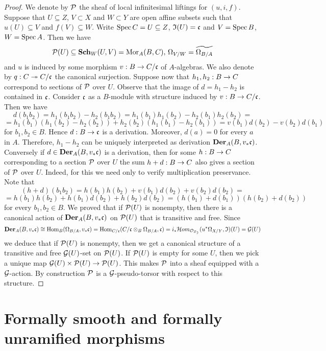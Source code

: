 \begin{proof}
We denote by ${\mathcal P}$ the sheaf of local infinitesimal liftings for $(u,i,f)$. Suppose that $U\subseteq Z$, $V\subset X$ and $W\subset Y$  are open affine subsets such that $u(U)\subseteq V$ and $f(V)\subseteq W$. Write $\mathrm{Spec}\, C = U\subseteq Z$, $\mathfrak{I}(U)=\mathfrak{c}$ and $V = \mathrm{Spec}\, B$, $W = \mathrm{Spec}\, A$. Then we have
$${\mathcal P}(U)\subseteq \mathbf{Sch}_W(U,V) = \mathrm{Mor}_A(B,C),\,\Omega_{V/W}=\widetilde{\Omega_{B/A}}$$
and $u$ is induced by some morphism $v:B\rightarrow C/\mathfrak{c}$ of $A$-algebras. We also denote by $q:C\twoheadrightarrow C/\mathfrak{c}$ the canonical surjection. Suppose now that $h_1,h_2:B\rightarrow C$ correspond to sections of ${\mathcal P}$ over $U$. Observe that the image of $d=h_1-h_2$ is contained in $\mathfrak{c}$. Consider $\mathfrak{c}$ as a $B$-module with structure induced by $v:B\rightarrow C/\mathfrak{c}$. Then we have
$$d(b_1b_2) = h_1(b_1b_2)-h_2(b_1b_2) = h_1(b_1)h_1(b_2)-h_2(b_1)h_2(b_2) =$$
$$= h_1(b_1)(h_1(b_2)-h_2(b_2))+h_2(b_2)(h_1(b_1)-h_2(b_1))=v(b_1)d(b_2)-v(b_2)d(b_1)$$
for $b_1,b_2\in B$. Hence $d:B\rightarrow \mathfrak{c}$ is a derivation. Moreover, $d(a)=0$ for every $a$ in $A$. Therefore, $h_1-h_2$ can be uniquely interpreted as derivation $\mathbf{Der}_A(B,v_*\mathfrak{c})$. Conversely if $d\in \mathbf{Der}_A(B,v_*\mathfrak{c})$ is a derivation, then for some $h:B\rightarrow C$ corresponding to a section ${\mathcal P}$ over $U$ the sum $h+d:B\rightarrow C$ also gives a section of ${\mathcal P}$ over $U$. Indeed, for this we need only to verify multiplication preservance. Note that
$$(h+d)(b_1b_2)=h(b_1)h(b_2)+v(b_1)d(b_2)+v(b_2)d(b_2)=$$
$$= h(b_1)h(b_2)+h(b_1)d(b_2)+h(b_2)d(b_2)=(h(b_1)+d(b_1))(h(b_2)+d(b_2))$$
for every $b_1,b_2\in B$. We proved that if ${\mathcal P}(U)$ is nonempty, then there is a canonical action of $\mathbf{Der}_A(B,v_*\mathfrak{c})$ on ${\mathcal P}(U)$ that is transitive and free. Since $$\mathbf{Der}_A(B,v_*\mathfrak{c})\cong \mathrm{Hom}_B(\Omega_{B/A},v_*\mathfrak{c})=\mathrm{Hom}_{C/\mathfrak{c}}(C/\mathfrak{c}\otimes_B\Omega_{B/A},\mathfrak{c})= i_*{\mathcal H}om_{{\mathcal O}_{Z_{\mathfrak{I}}}}(u^*\Omega_{X/Y},\mathfrak{I})(U)={\mathcal G}(U)$$
we deduce that if ${\mathcal P}(U)$ is nonempty, then we get a canonical structure of a transitive and free ${\mathcal G}(U)$-set on ${\mathcal P}(U)$. If ${\mathcal P}(U)$ is empty for some $U$, then we pick a unique map ${\mathcal G}(U)\times {\mathcal P}(U)\rightarrow {\mathcal P}(U)$. This makes ${\mathcal P}$ into a sheaf equipped with a ${\mathcal G}$-action. By construction ${\mathcal P}$ is a ${\mathcal G}$-pseudo-torsor with respect to this structure.
\end{proof}

\section{Formally smooth and formally unramified morphisms}

